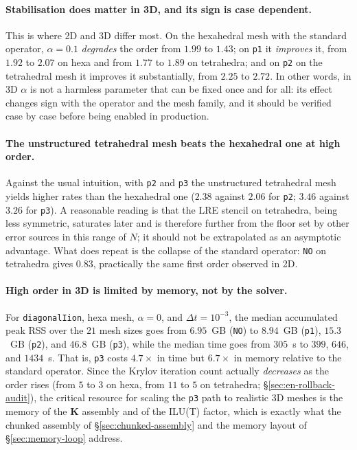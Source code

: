 \documentclass[11pt,a4paper]{article}
\newcommand{\code}[1]{\texttt{\small #1}}
\newcommand{\Kstif}{\mathbf{K}}
\begin{document}
\paragraph{Stabilisation does matter in 3D, and its sign is case dependent.}
This is where 2D and 3D differ most. On the hexahedral mesh with the standard
operator, $\alpha=0.1$ \emph{degrades} the order from $1.99$ to $1.43$; on
\code{p1} it \emph{improves} it, from $1.92$ to $2.07$ on hexa and from $1.77$
to $1.89$ on tetrahedra; and on \code{p2} on the tetrahedral mesh it improves it
substantially, from $2.25$ to $2.72$. In other words, in 3D $\alpha$ is not a
harmless parameter that can be fixed once and for all: its effect changes sign
with the operator and the mesh family, and it should be verified case by case
before being enabled in production.

\paragraph{The unstructured tetrahedral mesh beats the hexahedral one at high
order.}
Against the usual intuition, with \code{p2} and \code{p3} the unstructured
tetrahedral mesh yields higher rates than the hexahedral one ($2.38$ against
$2.06$ for \code{p2}; $3.46$ against $3.26$ for \code{p3}). A reasonable reading
is that the LRE stencil on tetrahedra, being less symmetric, saturates later and
is therefore further from the floor set by other error sources in this range of
$N$; it should not be extrapolated as an asymptotic advantage. What does repeat
is the collapse of the standard operator: \code{NO} on tetrahedra gives $0.83$,
practically the same first order observed in 2D.

\paragraph{High order in 3D is limited by memory, not by the solver.}
For \code{diagonalIion}, hexa mesh, $\alpha=0$, and $\Delta t=10^{-3}$, the
median accumulated peak RSS over the $21$ mesh sizes goes from $6.95$~GB
(\code{NO}) to $8.94$~GB (\code{p1}), $15.3$~GB (\code{p2}), and $46.8$~GB
(\code{p3}), while the median time goes from $305$~s to $399$, $646$, and
$1434$~s. That is, \code{p3} costs $4.7\times$ in time but $6.7\times$ in memory
relative to the standard operator. Since the Krylov iteration count actually
\emph{decreases} as the order rises (from $5$ to $3$ on hexa, from $11$ to $5$ on
tetrahedra; \S\ref{sec:en-rollback-audit}), the critical resource for scaling the
\code{p3} path to realistic 3D meshes is the memory of the $\Kstif$ assembly and
of the ILU(T) factor, which is exactly what the chunked assembly of
\S\ref{sec:chunked-assembly} and the memory layout of \S\ref{sec:memory-loop}
address.
\end{document}
